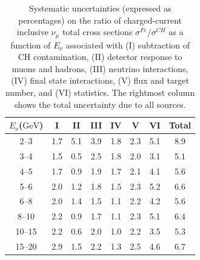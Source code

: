 \documentclass[aps,preprint,showpacs,superscriptaddress]{revtex4} %
\newcommand{\numu}{\ensuremath{\nu_{\mu}}\xspace}
\newcommand{\GeV}{\ensuremath{\mbox{GeV}}\xspace}
\newcommand{\Enu}{\ensuremath{E_{\nu}}\xspace}
\begin{document}
\begingroup
\squeezetable
\begin{table}
  \begin{tabular}{cccccccc}
    \hline \hline
    \Enu (\GeV) & I & II & III & IV & V & VI & Total \\ 
    \hline
    2--3 & 1.7 & 5.1 & 3.9 & 1.8 & 2.3 & 5.1 & 8.9 \\ 
    3--4 & 1.5 & 0.5 & 2.5 & 1.8 & 2.0 & 3.1 & 5.1 \\ 
    4--5 & 1.7 & 0.9 & 1.9 & 1.7 & 2.1 & 4.1 & 5.6 \\ 
    5--6 & 2.0 & 1.2 & 1.8 & 1.5 & 2.3 & 5.2 & 6.6 \\ 
    6--8 & 2.0 & 1.4 & 1.5 & 1.1 & 2.2 & 4.2 & 5.6 \\ 
    8--10 & 2.2 & 0.9 & 1.7 & 1.1 & 2.3 & 5.1 & 6.4 \\ 
    10--15 & 2.2 & 0.6 & 2.0 & 1.0 & 2.2 & 3.5 & 5.3 \\ 
    15--20 & 2.9 & 1.5 & 2.2 & 1.3 & 2.5 & 4.6 & 6.7 \\ 
    \hline \hline
  \end{tabular}
  \caption{Systematic uncertainties (expressed as percentages) on the ratio of charged-current inclusive \numu total cross sections $\sigma^{Fe}/\sigma^{CH}$ as a function of \Enu associated with  (I) subtraction of CH contamination, (II) detector response to muons and hadrons, (III) neutrino interactions, (IV) final state interactions, (V) flux and target number, and (VI) statistics.  The rightmost column shows the total uncertainty due to all sources.}
  \label{tab:Enu_ratio_26_92_sys_errors}
\end{table}
\endgroup
\end{document}
